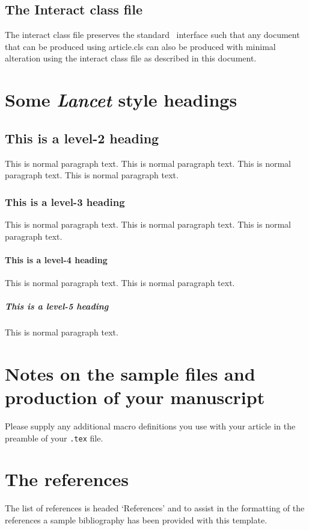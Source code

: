 \documentclass[]{interact}
\theoremstyle{plain}
\theoremstyle{definition}
\theoremstyle{remark}
\begin{document}
\subsection{The \textsf{Interact} class file}

The \textsf{interact} class file preserves the standard \LaTeXe\ interface such that any document that can be produced using \textsf{article.cls} can also be produced with minimal alteration using the \textsf{interact} class file as described in this document.

\section{Some {\itshape Lancet} style headings}

\subsection{This is a level-2 heading}

This is normal paragraph text.  This is normal paragraph text.  This is normal paragraph text.  This is normal paragraph text.

\subsubsection{This is a level-3 heading}

This is normal paragraph text.  This is normal paragraph text.  This is normal paragraph text.

\paragraph{This is a level-4 heading}

This is normal paragraph text.  This is normal paragraph text.

\subparagraph{This is a level-5 heading}

This is normal paragraph text.

\section{Notes on the sample files and production of your manuscript}

Please supply any additional macro definitions you use with your article in the preamble of your \texttt{.tex} file.

\section{The references}

The list of references is headed `References' and to assist in the formatting of the references a sample bibliography has been provided with this template.



\end{document}
